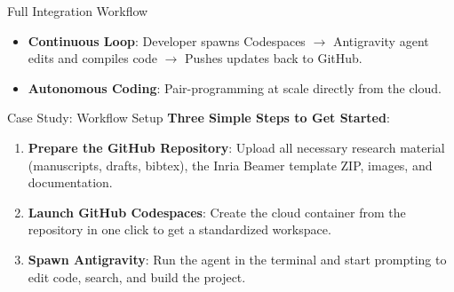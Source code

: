 \documentclass[A4,svgnames,9pt,aspectratio=169]{beamer}
\begin{document}
\begin{frame}{Full Integration Workflow}
    \begin{center}
    \end{center}
    \vspace{0.2cm}
    \begin{itemize}
        \setlength{\itemsep}{6pt}
        \item \textbf{Continuous Loop}: Developer spawns Codespaces $\to$ Antigravity agent edits and compiles code $\to$ Pushes updates back to GitHub.
        \item \textbf{Autonomous Coding}: Pair-programming at scale directly from the cloud.
    \end{itemize}
\end{frame}

\begin{frame}{Case Study: Workflow Setup}
    \textbf{Three Simple Steps to Get Started}:
    \vskip 12pt
    \begin{enumerate}
        \setlength{\itemsep}{14pt}
        \item \textbf{Prepare the GitHub Repository}:
              Upload all necessary research material (manuscripts, drafts, bibtex), the Inria Beamer template ZIP, images, and documentation.
        \item \textbf{Launch GitHub Codespaces}:
              Create the cloud container from the repository in one click to get a standardized workspace.
        \item \textbf{Spawn Antigravity}:
              Run the agent in the terminal and start prompting to edit code, search, and build the project.
    \end{enumerate}
\end{frame}
\end{document}

